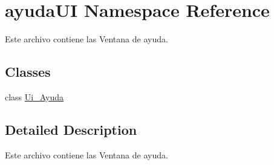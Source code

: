 \hypertarget{namespaceayuda_u_i}{\section{ayuda\-U\-I Namespace Reference}
\label{namespaceayuda_u_i}
}


Este archivo contiene las Ventana de ayuda.  


\subsection*{Classes}
\begin{DoxyCompactItemize}
\item 
class \hyperlink{classayuda_u_i_1_1_ui___ayuda}{Ui\-\_\-\-Ayuda}
\end{DoxyCompactItemize}


\subsection{Detailed Description}
Este archivo contiene las Ventana de ayuda. 
